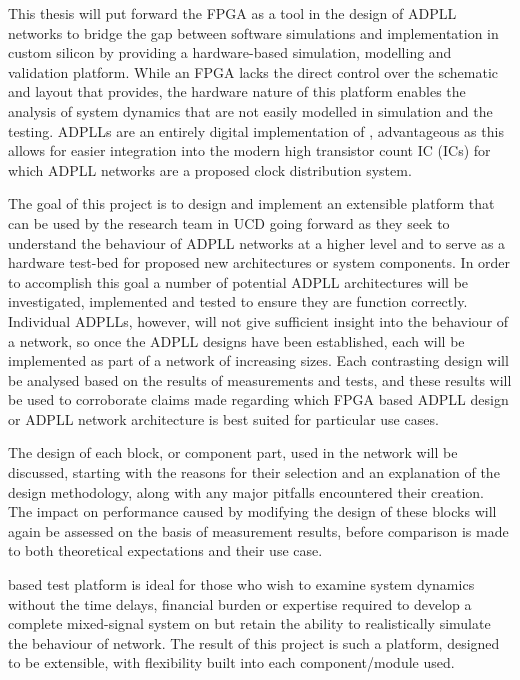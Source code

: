 This thesis will put forward the \ac{FPGA} as a tool in the design of \ac{ADPLL} networks to bridge the gap between software simulations and implementation in custom silicon by providing a hardware-based simulation, modelling and validation platform. While an FPGA lacks the direct control over the schematic and layout that  provides, the hardware nature of this platform enables the analysis of system dynamics that are not easily modelled in simulation and the testing. \acp{ADPLL} are an entirely digital implementation of , advantageous as this allows for easier integration into the modern high transistor count \acl{IC} (\acs{IC}s) for which \ac{ADPLL} networks are a proposed clock distribution system.

The goal of this project is to design and implement an extensible platform that can be used by the research team in \ac{UCD} going forward as they seek to understand the behaviour of \ac{ADPLL} networks at a higher level and to serve as a hardware test-bed for proposed new architectures or system components. In order to accomplish this goal a number of potential \ac{ADPLL} architectures will be investigated, implemented and tested to ensure they are function correctly. Individual \acsp{ADPLL}, however, will not give sufficient insight into the behaviour of a network, so once the \ac{ADPLL} designs have been established, each will be implemented as part of a network of increasing sizes. Each contrasting design will be analysed based on the results of measurements and tests, and these results will be used to corroborate claims made regarding which \ac{FPGA} based \ac{ADPLL} design or \ac{ADPLL} network architecture is best suited for particular use cases.

The design of each block, or component part, used in the network will be discussed, starting with the reasons for their selection and an explanation of the design methodology, along with any major pitfalls encountered their creation. The impact on performance caused by modifying the design of these blocks will again be assessed on the basis of measurement results, before comparison is made to both theoretical expectations and their use case.

 based test platform is ideal for those who wish to examine system dynamics without the time delays, financial burden or expertise required to develop a complete mixed-signal system on  but retain the ability to realistically simulate the behaviour of  network. The result of this project is such a platform, designed to be extensible, with flexibility built into each component/module used.